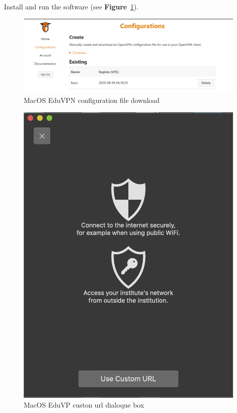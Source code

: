 Install and run the software (see \textbf{Figure}~\ref{fig:image45}).



\begin{figure}[!thb]
	\centering
	\includegraphics[scale=0.23]{Chapters/images/image45.png}
	
	\caption{MacOS EduVPN configuration file download }
	\label{fig:image45}
\end{figure}

\begin{figure}[!thb]
	\centering
	\includegraphics[scale=0.33]{Chapters/images/image105.png}
	
	\caption{MacOS EduVP custon url dialoque box }
	\label{fig:image105}
\end{figure}


